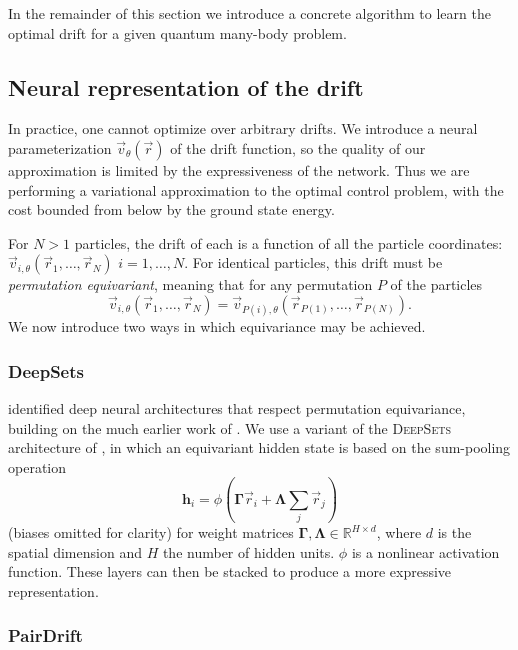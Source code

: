 \documentclass[12pt]{msml2020} %
\newcommand*{\br}{\vec{r}}
\begin{document}
In the remainder of this section we introduce a concrete algorithm to learn the optimal drift for a given quantum many-body problem.

\subsection{Neural representation of the drift}\label{sec:drift}

In practice, one cannot optimize over arbitrary drifts. We introduce a neural parameterization $\vec{v}_\theta(\vec{r})$ of the drift function, so the quality of our approximation is limited by the expressiveness of the network. Thus we are performing a variational approximation to the optimal control problem, with the cost bounded from below by the ground state energy.   

For $N>1$ particles, the drift of each is a function of all the particle coordinates: $\vec{v}_{i,\theta}(\vec{r}_1,\ldots,\vec{r}_N)$ $i=1,\ldots, N$. For identical particles, this drift must be \emph{permutation equivariant}, meaning that for any permutation $P$ of the particles
%
\begin{equation}
    \vec{v}_{i,\theta}(\vec{r}_1,\ldots,\vec{r}_N) = \vec{v}_{P(i),\theta}(\vec{r}_{P(1)},\ldots,\vec{r}_{P(N)}).
\end{equation}
%
We now introduce two ways in which equivariance may be achieved.

\subsubsection{DeepSets}\label{sec:deepsets}

\cite{Guttenberg:2016aa,Zaheer:2017aa} identified deep neural architectures that respect permutation equivariance, building on the much earlier work of \cite{Shawe-Taylor:1989aa}. We use a variant of the \textsc{DeepSets} architecture of \cite{Zaheer:2017aa}, in which an equivariant hidden state is based on the sum-pooling operation
%
$$
\mathbf{h}_i = \phi\left(\boldsymbol{\Gamma}\br_i + \boldsymbol{\Lambda}\sum_j\br_j\right)
$$
(biases omitted for clarity) for weight matrices $\boldsymbol{\Gamma}, \boldsymbol{\Lambda}\in \mathbb{R}^{H\times d}$, where $d$ is the spatial dimension and $H$ the number of hidden units. $\phi$ is a nonlinear activation function. These layers can then be stacked to produce a more expressive representation.

\subsubsection{PairDrift}\label{sec:pairdrift}
\end{document}
